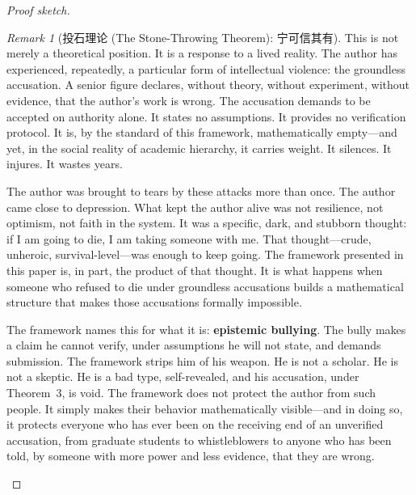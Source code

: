 \documentclass[12pt,a4paper]{ctexart}
\theoremstyle{definition}
\theoremstyle{remark}
\newtheorem{remark}{Remark}[section]
\begin{document}
\begin{proof}[Proof sketch]
\begin{remark}[投石理论 (The Stone-Throwing Theorem): 宁可信其有]
This is not merely a theoretical position. It is a response to a lived reality. The author has experienced, repeatedly, a particular form of intellectual violence: the groundless accusation. A senior figure declares, without theory, without experiment, without evidence, that the author's work is wrong. The accusation demands to be accepted on authority alone. It states no assumptions. It provides no verification protocol. It is, by the standard of this framework, mathematically empty—and yet, in the social reality of academic hierarchy, it carries weight. It silences. It injures. It wastes years.

The author was brought to tears by these attacks more than once. The author came close to depression. What kept the author alive was not resilience, not optimism, not faith in the system. It was a specific, dark, and stubborn thought: if I am going to die, I am taking someone with me. That thought—crude, unheroic, survival-level—was enough to keep going. The framework presented in this paper is, in part, the product of that thought. It is what happens when someone who refused to die under groundless accusations builds a mathematical structure that makes those accusations formally impossible.

The framework names this for what it is: \textbf{epistemic bullying}. The bully makes a claim he cannot verify, under assumptions he will not state, and demands submission. The framework strips him of his weapon. He is not a scholar. He is not a skeptic. He is a bad type, self-revealed, and his accusation, under Theorem~3, is void. The framework does not protect the author from such people. It simply makes their behavior mathematically visible—and in doing so, it protects everyone who has ever been on the receiving end of an unverified accusation, from graduate students to whistleblowers to anyone who has been told, by someone with more power and less evidence, that they are wrong.


\end{remark}
\end{proof}
\end{document}
